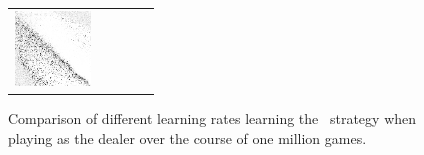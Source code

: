 \begin{figure}[h]
\begin{tabular}{c | c c c c}
			\includegraphics[width=2cm]{images/findings/experiments/learning_rate/lr_150_1mm.png} \\ %
	\end{tabular}

\caption{
	Comparison of different learning rates learning the \handmaxavg\ strategy
	when playing as the dealer
	over the course of one million games.
	}
\label{fig:expts-lr-comp}
\end{figure}
